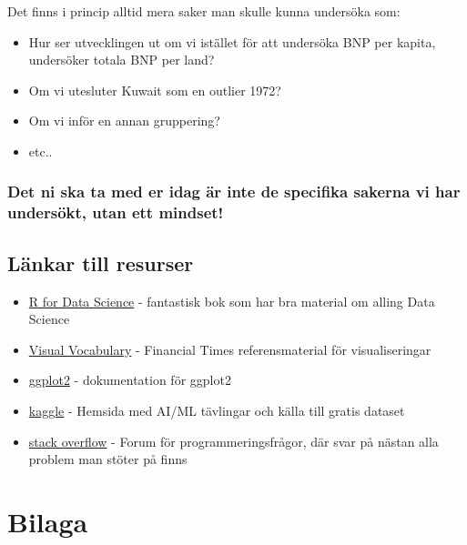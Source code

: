 \documentclass[
]{book}
\begin{document}
Det finns i princip alltid mera saker man skulle kunna undersöka som:

\begin{itemize}
\item
  Hur ser utvecklingen ut om vi istället för att undersöka BNP per kapita, undersöker totala BNP per land?
\item
  Om vi utesluter Kuwait som en outlier 1972?
\item
  Om vi inför en annan gruppering?
\item
  etc..
\end{itemize}

\hypertarget{det-ni-ska-ta-med-er-idag-uxe4r-inte-de-specifika-sakerna-vi-har-undersuxf6kt-utan-ett-mindset}{%
\subsection{Det ni ska ta med er idag är inte de specifika sakerna vi har undersökt, utan ett mindset!}\label{det-ni-ska-ta-med-er-idag-uxe4r-inte-de-specifika-sakerna-vi-har-undersuxf6kt-utan-ett-mindset}}

\hypertarget{luxe4nkar-till-resurser}{%
\section{Länkar till resurser}\label{luxe4nkar-till-resurser}}

\begin{itemize}
\item
  \href{https://r4ds.had.co.nz/}{R for Data Science} - fantastisk bok som har bra material om alling Data Science
\item
  \href{https://ft-interactive.github.io/visual-vocabulary/}{Visual Vocabulary} - Financial Times referensmaterial för visualiseringar
\item
  \href{https://ggplot2.tidyverse.org/}{ggplot2} - dokumentation för ggplot2
\item
  \href{https://www.kaggle.com/}{kaggle} - Hemsida med AI/ML tävlingar och källa till gratis dataset
\item
  \href{https://www.stackoverflow.com}{stack overflow} - Forum för programmeringsfrågor, där svar på nästan alla problem man stöter på finns
\end{itemize}

\hypertarget{bilaga}{%
\chapter{Bilaga}\label{bilaga}}
\end{document}
